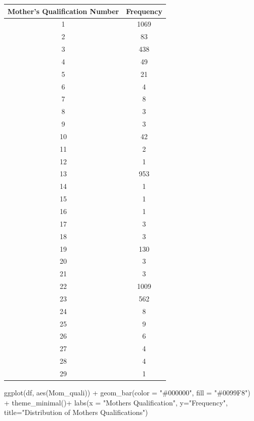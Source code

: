 \documentclass[
]{article}
\newenvironment{Shaded}{\begin{snugshade}}{\end{snugshade}}
\newcommand{\AttributeTok}[1]{\textcolor[rgb]{0.77,0.63,0.00}{#1}}
\newcommand{\FunctionTok}[1]{\textcolor[rgb]{0.00,0.00,0.00}{#1}}
\newcommand{\NormalTok}[1]{#1}
\newcommand{\SpecialCharTok}[1]{\textcolor[rgb]{0.00,0.00,0.00}{#1}}
\newcommand{\StringTok}[1]{\textcolor[rgb]{0.31,0.60,0.02}{#1}}
\begin{document}
\begin{table}
\centering
\begin{tabular}{c|c}
\hline
Mother's Qualification Number & Frequency\\
\hline
1 & 1069\\
\hline
2 & 83\\
\hline
3 & 438\\
\hline
4 & 49\\
\hline
5 & 21\\
\hline
6 & 4\\
\hline
7 & 8\\
\hline
8 & 3\\
\hline
9 & 3\\
\hline
10 & 42\\
\hline
11 & 2\\
\hline
12 & 1\\
\hline
13 & 953\\
\hline
14 & 1\\
\hline
15 & 1\\
\hline
16 & 1\\
\hline
17 & 3\\
\hline
18 & 3\\
\hline
19 & 130\\
\hline
20 & 3\\
\hline
21 & 3\\
\hline
22 & 1009\\
\hline
23 & 562\\
\hline
24 & 8\\
\hline
25 & 9\\
\hline
26 & 6\\
\hline
27 & 4\\
\hline
28 & 4\\
\hline
29 & 1\\
\hline
\end{tabular}
\end{table}

\begin{Shaded}
\begin{Highlighting}[]
\FunctionTok{ggplot}\NormalTok{(df, }\FunctionTok{aes}\NormalTok{(Mom\_quali)) }\SpecialCharTok{+}
  \FunctionTok{geom\_bar}\NormalTok{(}\AttributeTok{color =} \StringTok{"\#000000"}\NormalTok{, }\AttributeTok{fill =} \StringTok{"\#0099F8"}\NormalTok{) }\SpecialCharTok{+} \FunctionTok{theme\_minimal}\NormalTok{()}\SpecialCharTok{+}
  \FunctionTok{labs}\NormalTok{(}\AttributeTok{x =} \StringTok{"Mother\textquotesingle{}s Qualification"}\NormalTok{, }\AttributeTok{y=}\StringTok{"Frequency"}\NormalTok{, }\AttributeTok{title=}\StringTok{"Distribution of Mother\textquotesingle{}s Qualifications"}\NormalTok{)}
\end{Highlighting}
\end{Shaded}
\end{document}
